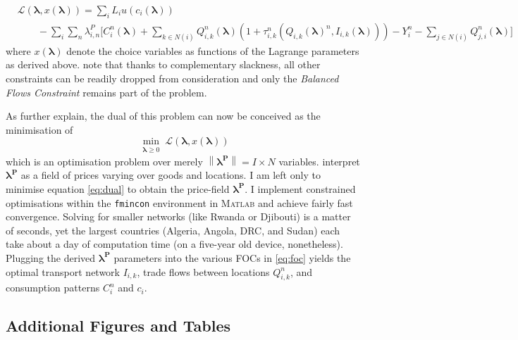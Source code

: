 \documentclass[11pt, oneside]{article}   	%
\begin{document}
\begin{spacing}{1.3}
\begin{equation}
  \label{eq:dual}
  \begin{aligned}
    & \mathcal{L}(\bm{\lambda}, x(\bm{\lambda})) = \sum_{i}^{} L_{i}u(c_{i}(\bm{\lambda})) \\
  & \qquad - \sum_{i}^{}\sum_{n}^{}\lambda^{P}_{i,n}\bigg[ C_{i}^{n}(\bm{\lambda}) + \sum_{k\in N(i)}^{}Q_{i,k}^{n}(\bm{\lambda})(1+\tau_{i,k}^{n}(Q_{i,k}(\bm{\lambda})^{n}, I_{i,k}(\bm{\lambda}))) - Y_{i}^{n} - \sum_{j\in N(i)}^{}Q_{j,i}^{n}(\bm{\lambda}) \bigg]
  \end{aligned}
\end{equation}
where $x(\bm{\lambda})$ denote the choice variables as functions of the Lagrange parameters as derived above. \citeauthor{Fajgelbaum_OptimalTransportNetworks_2017} note that thanks to complementary slackness, all other constraints can be readily dropped from consideration and only the \emph{Balanced Flows Constraint} remains part of the problem.

As \citeauthor{Fajgelbaum_OptimalTransportNetworks_2017} further explain, the dual of this problem can now be conceived as the minimisation of
\begin{equation*}
  \!\min_{\substack{\bm{\lambda} \geq 0}}\mathcal{L}(\bm{\lambda}, x(\bm{\lambda}))
\end{equation*}
which is an optimisation problem over merely $\left\lVert\bm{\lambda^{P}}\right\rVert = I \times N$ variables. \citeauthor{Fajgelbaum_OptimalTransportNetworks_2017} interpret $\bm{\lambda^{P}}$ as a field of prices varying over goods and locations. I am left only to minimise equation \eqref{eq:dual} to obtain the price-field $\bm{\lambda^{P}}$. I implement constrained optimisations within the \texttt{fmincon} environment in \textsc{Matlab} and achieve fairly fast convergence. Solving for smaller networks (like Rwanda or Djibouti) is a matter of seconds, yet the largest countries (Algeria, Angola, DRC, and Sudan) each take about a day of computation time (on a five-year old device, nonetheless). Plugging the derived $\bm{\lambda^{P}}$ parameters into the various FOCs in \eqref{eq:foc} yields the optimal transport network $I_{i,k}$, trade flows between locations $Q_{i,k}^{n}$, and consumption patterns $C_{i}^{n}$ and $c_{i}$.

\vfill
  \subsection{Additional Figures and Tables}



\end{spacing}
\end{document}
